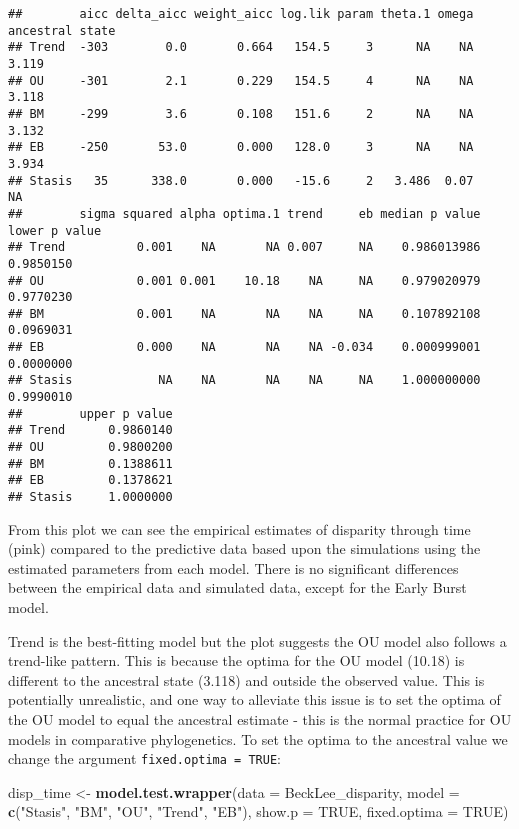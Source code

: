\documentclass[
]{book}
\newenvironment{Shaded}{\begin{snugshade}}{\end{snugshade}}
\newcommand{\AttributeTok}[1]{\textcolor[rgb]{0.13,0.29,0.53}{#1}}
\newcommand{\ConstantTok}[1]{\textcolor[rgb]{0.56,0.35,0.01}{#1}}
\newcommand{\FunctionTok}[1]{\textcolor[rgb]{0.13,0.29,0.53}{\textbf{#1}}}
\newcommand{\NormalTok}[1]{#1}
\newcommand{\OtherTok}[1]{\textcolor[rgb]{0.56,0.35,0.01}{#1}}
\newcommand{\StringTok}[1]{\textcolor[rgb]{0.31,0.60,0.02}{#1}}
\begin{document}
\begin{verbatim}
##        aicc delta_aicc weight_aicc log.lik param theta.1 omega ancestral state
## Trend  -303        0.0       0.664   154.5     3      NA    NA           3.119
## OU     -301        2.1       0.229   154.5     4      NA    NA           3.118
## BM     -299        3.6       0.108   151.6     2      NA    NA           3.132
## EB     -250       53.0       0.000   128.0     3      NA    NA           3.934
## Stasis   35      338.0       0.000   -15.6     2   3.486  0.07              NA
##        sigma squared alpha optima.1 trend     eb median p value lower p value
## Trend          0.001    NA       NA 0.007     NA    0.986013986     0.9850150
## OU             0.001 0.001    10.18    NA     NA    0.979020979     0.9770230
## BM             0.001    NA       NA    NA     NA    0.107892108     0.0969031
## EB             0.000    NA       NA    NA -0.034    0.000999001     0.0000000
## Stasis            NA    NA       NA    NA     NA    1.000000000     0.9990010
##        upper p value
## Trend      0.9860140
## OU         0.9800200
## BM         0.1388611
## EB         0.1378621
## Stasis     1.0000000
\end{verbatim}

From this plot we can see the empirical estimates of disparity through time (pink) compared to the predictive data based upon the simulations using the estimated parameters from each model.
There is no significant differences between the empirical data and simulated data, except for the Early Burst model.

Trend is the best-fitting model but the plot suggests the OU model also follows a trend-like pattern.
This is because the optima for the OU model (10.18) is different to the ancestral state (3.118) and outside the observed value.
This is potentially unrealistic, and one way to alleviate this issue is to set the optima of the OU model to equal the ancestral estimate - this is the normal practice for OU models in comparative phylogenetics.
To set the optima to the ancestral value we change the argument \texttt{fixed.optima\ =\ TRUE}:

\begin{Shaded}
\begin{Highlighting}[]
\NormalTok{disp\_time }\OtherTok{\textless{}{-}} \FunctionTok{model.test.wrapper}\NormalTok{(}\AttributeTok{data =}\NormalTok{ BeckLee\_disparity,}
                    \AttributeTok{model =} \FunctionTok{c}\NormalTok{(}\StringTok{"Stasis"}\NormalTok{, }\StringTok{"BM"}\NormalTok{, }\StringTok{"OU"}\NormalTok{, }\StringTok{"Trend"}\NormalTok{, }\StringTok{"EB"}\NormalTok{),}
                                \AttributeTok{show.p =} \ConstantTok{TRUE}\NormalTok{, }\AttributeTok{fixed.optima =} \ConstantTok{TRUE}\NormalTok{)}
\end{Highlighting}
\end{Shaded}
\end{document}
